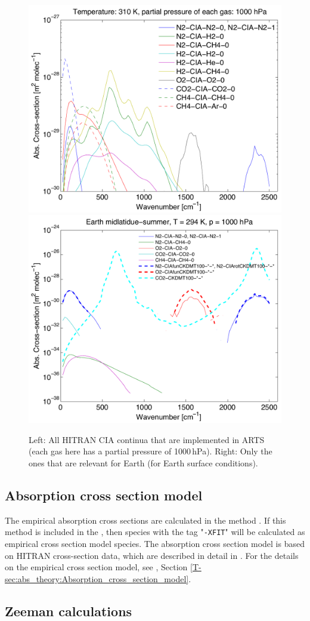 \begin{figure}
 \begin{center}
  \includegraphics[width=.46\hsize]{plot_all_arts_cia_generic_1}
  \hspace{\fill}
  \includegraphics[width=.46\hsize]{plot_earth_continua_1_1}
  \caption{Left: All HITRAN CIA continua that are implemented in ARTS
    (each gas here has a partial pressure of 1000\,hPa). Right: Only
    the ones that are relevant for Earth (for Earth surface
    conditions).}
  \label{fig:absorption:cia}
 \end{center}
\end{figure}

\subsection{Absorption cross section model}

The empirical absorption cross sections are calculated in the method .
If this method is included in the , then species with the
tag "\verb|-XFIT|" will be calculated as empirical cross section model species. 
The absorption cross section model is based on HITRAN cross-section data, which are described in detail in 
\cite{gordon17:_hitran2016_jqsrt}. For the details on the empirical cross section model, see \theory, 
Section \ref{T-sec:abs_theory:Absorption_cross_section_model}. 

\subsection{Zeeman calculations}
\label{sec:absorption:zeeman}

